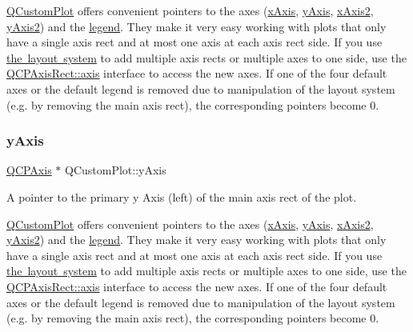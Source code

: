\mbox{\hyperlink{class_q_custom_plot}{Q\+Custom\+Plot}} offers convenient pointers to the axes (\mbox{\hyperlink{class_q_custom_plot_a9a79cd0158a4c7f30cbc702f0fd800e4}{x\+Axis}}, \mbox{\hyperlink{class_q_custom_plot_af6fea5679725b152c14facd920b19367}{y\+Axis}}, \mbox{\hyperlink{class_q_custom_plot_ada41599f22cad901c030f3dcbdd82fd9}{x\+Axis2}}, \mbox{\hyperlink{class_q_custom_plot_af13fdc5bce7d0fabd640f13ba805c0b7}{y\+Axis2}}) and the \mbox{\hyperlink{class_q_custom_plot_a4eadcd237dc6a09938b68b16877fa6af}{legend}}. They make it very easy working with plots that only have a single axis rect and at most one axis at each axis rect side. If you use \mbox{\hyperlink{}{the layout system}} to add multiple axis rects or multiple axes to one side, use the \mbox{\hyperlink{class_q_c_p_axis_rect_a583ae4f6d78b601b732183f6cabecbe1}{Q\+C\+P\+Axis\+Rect\+::axis}} interface to access the new axes. If one of the four default axes or the default legend is removed due to manipulation of the layout system (e.\+g. by removing the main axis rect), the corresponding pointers become 0. \mbox{\label{class_q_custom_plot_af6fea5679725b152c14facd920b19367}} 
\subsubsection{\texorpdfstring{y\+Axis}{yAxis}}
{\footnotesize\ttfamily \mbox{\hyperlink{class_q_c_p_axis}{Q\+C\+P\+Axis}} $\ast$ Q\+Custom\+Plot\+::y\+Axis}

A pointer to the primary y Axis (left) of the main axis rect of the plot.

\mbox{\hyperlink{class_q_custom_plot}{Q\+Custom\+Plot}} offers convenient pointers to the axes (\mbox{\hyperlink{class_q_custom_plot_a9a79cd0158a4c7f30cbc702f0fd800e4}{x\+Axis}}, \mbox{\hyperlink{class_q_custom_plot_af6fea5679725b152c14facd920b19367}{y\+Axis}}, \mbox{\hyperlink{class_q_custom_plot_ada41599f22cad901c030f3dcbdd82fd9}{x\+Axis2}}, \mbox{\hyperlink{class_q_custom_plot_af13fdc5bce7d0fabd640f13ba805c0b7}{y\+Axis2}}) and the \mbox{\hyperlink{class_q_custom_plot_a4eadcd237dc6a09938b68b16877fa6af}{legend}}. They make it very easy working with plots that only have a single axis rect and at most one axis at each axis rect side. If you use \mbox{\hyperlink{}{the layout system}} to add multiple axis rects or multiple axes to one side, use the \mbox{\hyperlink{class_q_c_p_axis_rect_a583ae4f6d78b601b732183f6cabecbe1}{Q\+C\+P\+Axis\+Rect\+::axis}} interface to access the new axes. If one of the four default axes or the default legend is removed due to manipulation of the layout system (e.\+g. by removing the main axis rect), the corresponding pointers become 0. \mbox{\label{class_q_custom_plot_af13fdc5bce7d0fabd640f13ba805c0b7}} 
